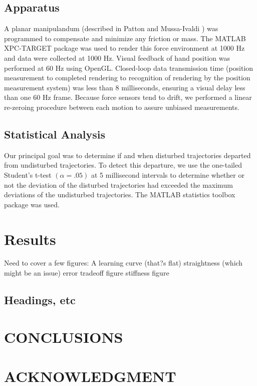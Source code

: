 \documentclass[letterpaper, 10 pt, conference]{ieeeconf}  %
\begin{document}
\subsection*{Apparatus}
A planar manipulandum (described in Patton and Mussa-Ivaldi \cite{patton2004robot}) was programmed to compensate and minimize any friction or mass. The MATLAB XPC-TARGET package \cite{MATLAB:2008} was used to render this force environment at 1000 Hz and data were collected at 1000 Hz.  Visual feedback of hand position was performed at 60 Hz using OpenGL. Closed-loop data transmission time (position measurement to completed rendering to recognition of rendering by the position measurement system) was less than 8 milliseconds, ensuring a visual delay less than one 60 Hz frame. Because force sensors tend to drift, we performed a linear re-zeroing procedure between each motion to assure unbiased measurements.

\subsection*{Statistical Analysis}
Our principal goal was to determine if and when disturbed trajectories departed from undisturbed trajectories. To detect this departure, we use the one-tailed Student's t-test $(\alpha=.05)$ at 5 millisecond intervals to determine whether or not the deviation of the disturbed trajectories had exceeded the maximum deviations of the undisturbed trajectories. The MATLAB statistics toolbox package \cite{MATLAB:2008} was used.

\section{Results}

Need to cover a few figures:
A learning curve (that?s flat)
straightness (which might be an issue)
error tradeoff figure
stiffness figure

\subsection{Headings, etc}


\section{CONCLUSIONS}


\section*{ACKNOWLEDGMENT}





\end{document}
